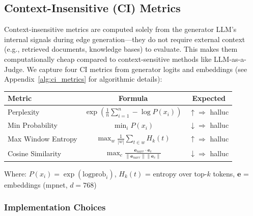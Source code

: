 \subsection{Context-Insensitive (CI) Metrics}
\label{sec:ci_metrics_definition}
Context-insensitive metrics are computed solely from the generator LLM's internal signals during edge generation---they do not require external context (e.g., retrieved documents, knowledge bases) to evaluate. This makes them computationally cheap compared to context-sensitive methods like LLM-as-a-Judge. We capture four CI metrics from generator logits and embeddings (see Appendix~\ref{alg:ci_metrics} for algorithmic details):

\begin{table}[H]
\centering
\footnotesize
\begin{tabular}{@{}lcc@{}}
\toprule
\textbf{Metric} & \textbf{Formula} & \textbf{Expected} \\
\midrule
Perplexity & $\displaystyle\exp\left(\frac{1}{n}\sum_{i=1}^{n} -\log P(x_i)\right)$ & $\uparrow \Rightarrow$ halluc \\[1.5ex]
Min Probability & $\displaystyle\min_i P(x_i)$ & $\downarrow \Rightarrow$ halluc \\[1.5ex]
Max Window Entropy & $\displaystyle\max_w \frac{1}{|w|} \sum_{t \in w} H_k(t)$ & $\uparrow \Rightarrow$ halluc \\[1.5ex]
Cosine Similarity & $\displaystyle\max_c \frac{\mathbf{e}_{narr} \cdot \mathbf{e}_c}{\|\mathbf{e}_{narr}\| \|\mathbf{e}_c\|}$ & $\downarrow \Rightarrow$ halluc \\
\bottomrule
\end{tabular}
\end{table}

Where: $P(x_i) = \exp(\text{logprob}_i)$, $H_k(t)$ = entropy over top-$k$ tokens, $\mathbf{e}$ = embeddings (mpnet, $d=768$)

\subsubsection{Implementation Choices}

